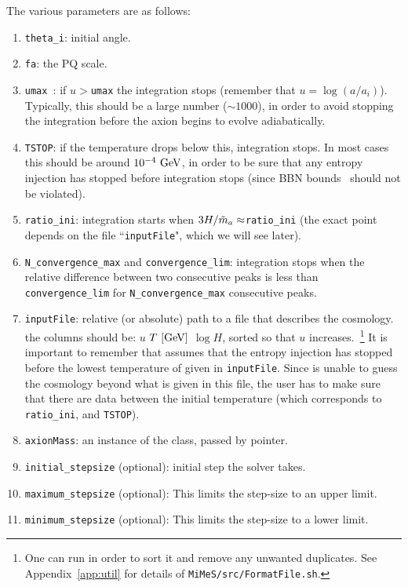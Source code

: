 \documentclass[11pt,a4paper]{article}
\begin{document}
The various parameters are as follows:
%
\begin{enumerate}
	\item {\tt theta\_i}: initial angle.
	\item {\tt fa}: the PQ scale.
	\item {\tt umax }: if $u>${\tt umax} the integration stops (remember that $u=\log(a/a_i)$). Typically, this should be a large number ($\sim 1000$), in order to avoid stopping the integration before the axion begins to evolve  adiabatically.    
	\item {\tt TSTOP}: if the temperature drops below this, integration stops. In most cases this should be around 
	$10^{-4}~{\rm GeV}$, in order to be sure that any entropy injection has stopped before integration stops (since BBN bounds~\cite{Kolb:206230,Peebles:1993} should not be violated).
	\item {\tt ratio\_ini}: integration starts when $3H/\tilde m_{a}{} \approx${\tt ratio\_ini} (the exact point depends on the file ``{\tt inputFile}", which we will see later). 
	\item  {\tt N\_convergence\_max} and {\tt convergence\_lim}: integration stops when the relative difference 
	between two consecutive peaks is less than {\tt convergence\_lim} for {\tt N\_convergence\_max} 
	consecutive peaks.
	\item  {\tt inputFile}: relative (or absolute) path to a file that describes the cosmology. the columns should be: $u$ $T ~[{\rm GeV}]$ $\log H$, sorted so that $u$ increases.~\footnote{One can run  in order to sort it and remove any unwanted duplicates. See Appendix~\ref{app:util} for details of {\tt MiMeS/src/FormatFile.sh}.}
	It is important to remember that \mimes assumes that the entropy injection has stopped before the lowest temperature of given in {\tt inputFile}. Since \mimes is unable to guess the cosmology beyond what is given in this file, the user has to make sure that there are data between the initial temperature (which corresponds to {\tt ratio\_ini}, and {\tt TSTOP}).
	
	\item {\tt axionMass}: an instance of the  class, passed by pointer. 
	
	\item {\tt initial\_stepsize} (optional): initial step the solver takes. 
	
	\item {\tt maximum\_stepsize} (optional): This limits the step-size to an upper limit. 
	\item {\tt minimum\_stepsize} (optional): This limits the step-size to a lower limit. 
	

\end{enumerate}
\end{document}
